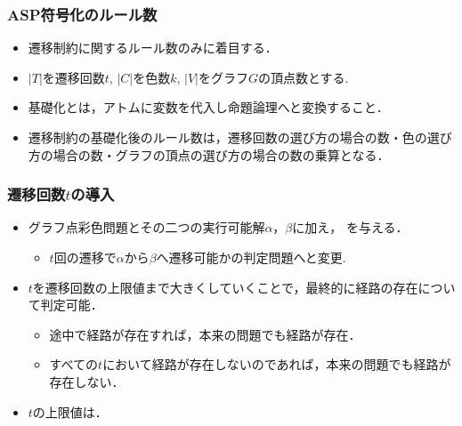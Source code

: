 
\begin{frame}\frametitle{ASP符号化のルール数}
  \begin{itemize}
    \item 遷移制約に関するルール数のみに着目する．
    \item $|T|$を遷移回数$t$, $|C|$を色数$k$, $|V|$をグラフ$G$の頂点数とする.
  \end{itemize}

  \begin{table}[t]
    \centering
    
  \end{table}

  \begin{itemize}
    \item 基礎化とは，アトムに変数を代入し命題論理へと変換すること．
    \item 遷移制約の基礎化後のルール数は，遷移回数の選び方の場合の数・色の選び方の場合の数・グラフの頂点の選び方の場合の数の乗算となる．
  \end{itemize}
\end{frame}


\begin{frame}\frametitle{遷移回数$t$の導入}

  \begin{itemize}
    \item グラフ点彩色問題とその二つの実行可能解$\alpha$，$\beta$に加え， を与える．
    \begin{itemize}
      \item $t$回の遷移で$\alpha$から$\beta$へ遷移可能かの判定問題へと変更. 
    \end{itemize}
    \item $t$を遷移回数の上限値まで大きくしていくことで，最終的に経路の存在について判定可能．
    \begin{itemize}
      \item 途中で経路が存在すれば，本来の問題でも経路が存在．
      \item すべての$t$において経路が存在しないのであれば，本来の問題でも経路が存在しない．
    \end{itemize}
    \item $t$の上限値は．
  \end{itemize}
  
\end{frame}

